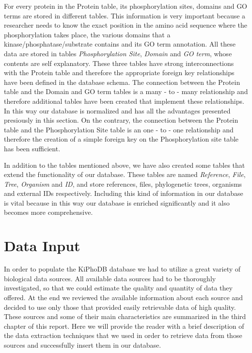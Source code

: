 For every protein in the Protein table, its phosphorylation sites, domains and GO terms are stored in different tables.
This information is very important because a researcher needs to know the exact position in the amino acid sequence where the phosphorylation takes place, the various domains that a kinase/phosphatase/substrate contains and its GO term annotation.
All these data are stored in tables \textsl{Phosphorylation Site}, \textsl{Domain} and \textsl{GO term}, whose contents are self explanatory.
These three tables have strong interconnections with the Protein table and therefore the appropriate foreign key relationships have been defined in the database schema.
The connection between the Protein table and the Domain and GO term tables is a many - to - many relationship and therefore additional tables have been created that implement these relationships.
In this way our database is normalized and has all the advantages presented presiously in this section.
On the contrary, the connection between the Protein table and the Phosphorylation Site table is an one - to - one relationship and therefore the creation of a simple foreign key on the Phosphorylation site table has been sufficient.

In addition to the tables mentioned above, we have also created some tables that extend the functionality of our database.
These tables are named \textsl{Reference}, \textsl{File}, \textsl{Tree}, \textsl{Organism} and \textsl{ID}, and store references, files, phylogenetic trees, organisms and external IDs respectively.
Including this kind of information in our database is vital because in this way our database is enriched significantly and it also becomes more comprehensive.

\section{Data Input}
In order to populate the KiPhoDB database we had to utilize a great variety of biological data sources.
All available data sources had to be thoroughly investigated, so that we could estimate the quality and quantity of data they offered.
At the end we reviewed the available information about each source and decided to use only those that provided easily retrievable data of high quality.
These sources and some of their main characteristics are summarized in the third chapter of this report.
Here we will provide the reader with a brief description of the data extraction techniques that we used in order to retrieve data from those sources and successfully insert them in our database.

